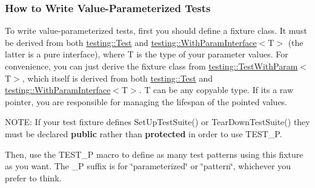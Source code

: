 \subsubsection*{How to Write Value-\/\+Parameterized Tests}

To write value-\/parameterized tests, first you should define a fixture class. It must be derived from both {\ttfamily \mbox{\hyperlink{classtesting_1_1_test}{testing\+::\+Test}}} and {\ttfamily \mbox{\hyperlink{classtesting_1_1_with_param_interface}{testing\+::\+With\+Param\+Interface}}$<$T$>$} (the latter is a pure interface), where {\ttfamily T} is the type of your parameter values. For convenience, you can just derive the fixture class from {\ttfamily \mbox{\hyperlink{classtesting_1_1_test_with_param}{testing\+::\+Test\+With\+Param}}$<$T$>$}, which itself is derived from both {\ttfamily \mbox{\hyperlink{classtesting_1_1_test}{testing\+::\+Test}}} and {\ttfamily \mbox{\hyperlink{classtesting_1_1_with_param_interface}{testing\+::\+With\+Param\+Interface}}$<$T$>$}. {\ttfamily T} can be any copyable type. If it\textquotesingle{}s a raw pointer, you are responsible for managing the lifespan of the pointed values.

N\+O\+TE\+: If your test fixture defines {\ttfamily Set\+Up\+Test\+Suite()} or {\ttfamily Tear\+Down\+Test\+Suite()} they must be declared {\bfseries{public}} rather than {\bfseries{protected}} in order to use {\ttfamily T\+E\+S\+T\+\_\+P}.


\begin{DoxyCode}{0}
\DoxyCodeLine{\};}
\DoxyCodeLine{}
\DoxyCodeLine{\};}
\DoxyCodeLine{\};}
\end{DoxyCode}


Then, use the {\ttfamily T\+E\+S\+T\+\_\+P} macro to define as many test patterns using this fixture as you want. The {\ttfamily \+\_\+P} suffix is for \char`\"{}parameterized\char`\"{} or \char`\"{}pattern\char`\"{}, whichever you prefer to think.


